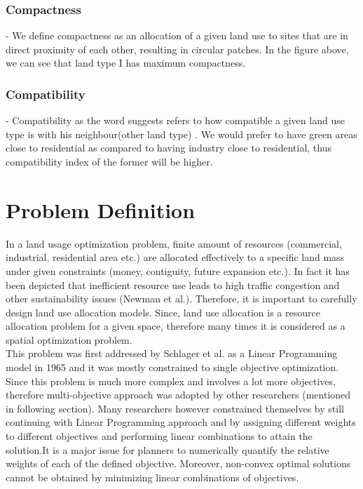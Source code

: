 \documentclass{sig-alternate}
\begin{document}
\subsubsection*{Compactness} - We define compactness as an allocation of a given land use to sites that are in direct proximity of each other, resulting in circular patches. In the figure above, we can see that land type I has maximum compactness.

\subsubsection*{Compatibility} - Compatibility  as the word suggests refers to how compatible a given land use type is with his neighbour(other land type) . We would prefer to have green areas close to residential as compared to having industry close to residential, thus compatibility index of the former will be higher.\\[.25cm]

\section{Problem Definition}

In a land usage optimization problem, finite amount of resources (commercial, industrial, residential area etc.) are allocated effectively to a specific land mass under given constraints (money, contiguity, future expansion etc.). In fact it has been depicted that inefficient resource use leads to high traffic congestion and other sustainability issues (Newman et al.). Therefore, it is important to carefully design land use allocation models. Since, land use allocation is a resource allocation problem for a given space, therefore many times it is considered as a spatial optimization problem. \\
This problem was first addressed by Schlager et al. as a Linear Programming model in 1965 and it was mostly constrained to single objective optimization. Since this problem is much more complex and involves a lot more objectives, therefore multi-objective approach was adopted by other researchers (mentioned in following section).  Many researchers however constrained themselves by still continuing with Linear Programming approach and by assigning different weights to different objectives and performing linear combinations to attain the solution.It is a major issue for planners to numerically quantify the relative weights of each of the defined objective. Moreover, non-convex optimal solutions cannot be obtained by minimizing linear combinations of objectives.
\end{document}
